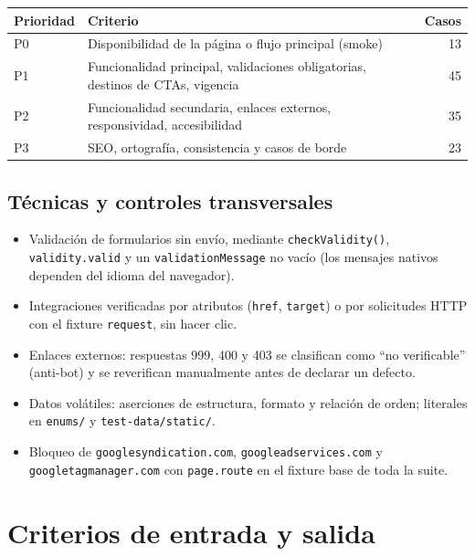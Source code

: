 \documentclass[11pt,a4paper]{article}
\begin{document}
\begin{table}[H]
\centering\small
\begin{tabularx}{\textwidth}{@{}l X r@{}}
\toprule
Prioridad & Criterio & Casos \\
\midrule
P0 & Disponibilidad de la página o flujo principal (smoke) & 13 \\
P1 & Funcionalidad principal, validaciones obligatorias, destinos de CTAs, vigencia & 45 \\
P2 & Funcionalidad secundaria, enlaces externos, responsividad, accesibilidad & 35 \\
P3 & SEO, ortografía, consistencia y casos de borde & 23 \\
\bottomrule
\end{tabularx}
\end{table}

\subsection{Técnicas y controles transversales}

\begin{itemize}
  \item Validación de formularios sin envío, mediante \texttt{checkValidity()},
        \texttt{validity.valid} y un \texttt{validationMessage} no vacío (los mensajes nativos
        dependen del idioma del navegador).
  \item Integraciones verificadas por atributos (\texttt{href}, \texttt{target}) o por solicitudes
        HTTP con el fixture \texttt{request}, sin hacer clic.
  \item Enlaces externos: respuestas 999, 400 y 403 se clasifican como ``no verificable'' (anti-bot)
        y se reverifican manualmente antes de declarar un defecto.
  \item Datos volátiles: aserciones de estructura, formato y relación de orden; literales en
        \texttt{enums/} y \texttt{test-data/static/}.
  \item Bloqueo de \texttt{googlesyndication.com}, \texttt{googleadservices.com} y
        \texttt{googletagmanager.com} con \texttt{page.route} en el fixture base de toda la suite.
\end{itemize}

\section{Criterios de entrada y salida}
\end{document}
